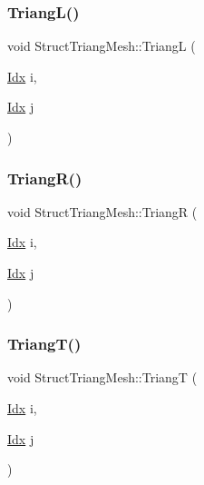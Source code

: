 \mbox{\label{structStructTriangMesh_ab46b92d1b67ea75a4f9151bac1a0bb30}} 
\subsubsection{\texorpdfstring{Triang\+L()}{TriangL()}}
{\footnotesize\ttfamily void Struct\+Triang\+Mesh\+::\+TriangL (\begin{DoxyParamCaption}\item[{\hyperlink{Includes_8h_ae78891cd308078a2f5f9e7193065c805}{Idx}}]{i,  }\item[{\hyperlink{Includes_8h_ae78891cd308078a2f5f9e7193065c805}{Idx}}]{j }\end{DoxyParamCaption})\hspace{0.3cm}{\ttfamily [private]}}

\mbox{\label{structStructTriangMesh_ad7cae67790602f8b907b7da014d167b4}} 
\subsubsection{\texorpdfstring{Triang\+R()}{TriangR()}}
{\footnotesize\ttfamily void Struct\+Triang\+Mesh\+::\+TriangR (\begin{DoxyParamCaption}\item[{\hyperlink{Includes_8h_ae78891cd308078a2f5f9e7193065c805}{Idx}}]{i,  }\item[{\hyperlink{Includes_8h_ae78891cd308078a2f5f9e7193065c805}{Idx}}]{j }\end{DoxyParamCaption})\hspace{0.3cm}{\ttfamily [private]}}

\mbox{\label{structStructTriangMesh_a1833d4deea986d3d13aaea07fbc95115}} 
\subsubsection{\texorpdfstring{Triang\+T()}{TriangT()}}
{\footnotesize\ttfamily void Struct\+Triang\+Mesh\+::\+TriangT (\begin{DoxyParamCaption}\item[{\hyperlink{Includes_8h_ae78891cd308078a2f5f9e7193065c805}{Idx}}]{i,  }\item[{\hyperlink{Includes_8h_ae78891cd308078a2f5f9e7193065c805}{Idx}}]{j }\end{DoxyParamCaption})\hspace{0.3cm}{\ttfamily [private]}}



